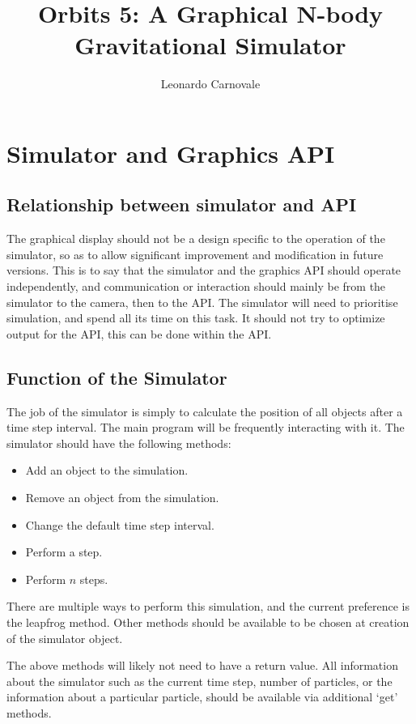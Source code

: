 \documentclass{report}
\title{Orbits 5: A Graphical N-body Gravitational Simulator}
\author{Leonardo Carnovale}
\begin{document}
  \maketitle

  \tableofcontents
  \chapter{Simulator and Graphics API}
    \section{Relationship between simulator and API}
      The graphical display should not be a design specific to the
      operation of the simulator, so as to allow significant improvement
      and modification in future versions. This is to say that the
      simulator and the graphics API should operate independently, and
      communication or interaction should mainly be from the simulator to the camera,
      then to the API. The simulator will need to prioritise simulation, and spend all
      its time on this task. It should not try to optimize output for the API,
      this can be done within the API.

    \section{Function of the Simulator}
      The job of the simulator is simply to calculate the position of all objects
      after a time step interval. The main program will be frequently interacting with it.
      The simulator should have the following methods:
      \begin{itemize}
        \item Add an object to the simulation.
        \item Remove an object from the simulation.
        \item Change the default time step interval.
        \item Perform a step.
        \item Perform $n$ steps.
      \end{itemize}
      There are multiple ways to perform this simulation, and the current preference
      is the leapfrog method. Other methods should be available to be chosen at creation of
      the simulator object.

      The above methods will likely not need to have a return value. All information about the
      simulator such as the current time step, number of particles, or the information about a
      particular particle, should be available via additional `get' methods.
\end{document}
